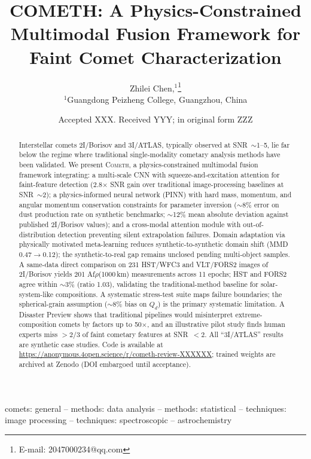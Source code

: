 \documentclass[usenatbib]{mnras}
\begin{document}
\title[COMETH: A Physics-Constrained Multimodal Fusion Framework]{COMETH: A Physics-Constrained Multimodal Fusion Framework for Faint Comet Characterization}

\author[Chen]{
Zhilei Chen,$^{1}$\thanks{E-mail: 2047000234@qq.com}
\\
$^{1}$Guangdong Peizheng College, Guangzhou, China
}

\date{Accepted XXX. Received YYY; in original form ZZZ}

\begin{abstract}
Interstellar comets 2I/Borisov and 3I/ATLAS, typically observed at SNR~$\sim$1--5, lie far below the regime where traditional single-modality cometary analysis methods have been validated. We present \textsc{Cometh}, a physics-constrained multimodal fusion framework integrating: a multi-scale CNN with squeeze-and-excitation attention for faint-feature detection (2.8$\times$ SNR gain over traditional image-processing baselines at SNR~$\sim$2); a physics-informed neural network (PINN) with hard mass, momentum, and angular momentum conservation constraints for parameter inversion ($\sim$8\% error on dust production rate on synthetic benchmarks; $\sim$12\% mean absolute deviation against published 2I/Borisov values); and a cross-modal attention module with out-of-distribution detection preventing silent extrapolation failures. Domain adaptation via physically motivated meta-learning reduces synthetic-to-synthetic domain shift (MMD 0.47$\to$0.12); the synthetic-to-real gap remains unclosed pending multi-object samples. A same-data direct comparison on 231 HST/WFC3 and VLT/FORS2 images of 2I/Borisov yields 201 Af$\rho$(1000\,km) measurements across 11 epochs; HST and FORS2 agree within $\sim$3\% (ratio 1.03), validating the traditional-method baseline for solar-system-like compositions. A systematic stress-test suite maps failure boundaries; the spherical-grain assumption ($\sim$8\% bias on $Q_d$) is the primary systematic limitation. A Disaster Preview shows that traditional pipelines would misinterpret extreme-composition comets by factors up to 50$\times$, and an illustrative pilot study finds human experts miss $>2/3$ of faint cometary features at SNR~$<2$. All ``3I/ATLAS'' results are synthetic case studies. Code is available at \url{https://anonymous.4open.science/r/cometh-review-XXXXXX}; trained weights are archived at Zenodo (DOI embargoed until acceptance).
\end{abstract}

\begin{keywords}
comets: general -- methods: data analysis -- methods: statistical -- techniques: image processing -- techniques: spectroscopic -- astrochemistry
\end{keywords}
\end{document}
